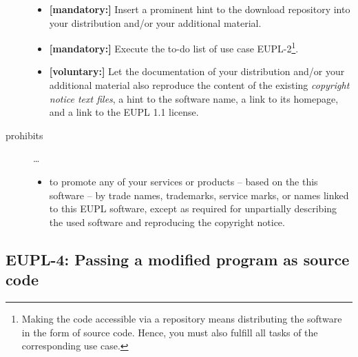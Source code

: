 \begin{description}
\begin{itemize}
 \item \textbf{[mandatory:]} Insert a prominent hint to the download repository
  into your distribution and/or your additional material.
  
  \item \textbf{[mandatory:]} Execute the to-do list of use case EUPL-2\footnote{
  Making the code accessible via a repository means distributing the software in
  the form of source code. Hence, you must also fulfill all tasks of the
  corresponding use case.}.
 
  \item \textbf{[voluntary:]} Let the documentation of your distribution and/or
  your additional material also reproduce the content of the existing
  \emph{copyright notice text files}, a hint to the software name, a link to its
  homepage, and a link to the EUPL 1.1 license.
\end{itemize}

\item[prohibits] \ldots
\begin{itemize}
  \item to promote any of your services or products -- based on the this software
  -- by trade names, trademarks, service marks, or names linked to this EUPL
  software, except as required for unpartially describing the used software and
  reproducing the copyright notice.
\end{itemize}

\end{description}

\subsection{EUPL-4: Passing a modified program as source code}
\label{OSUC-04-EUPL} 

